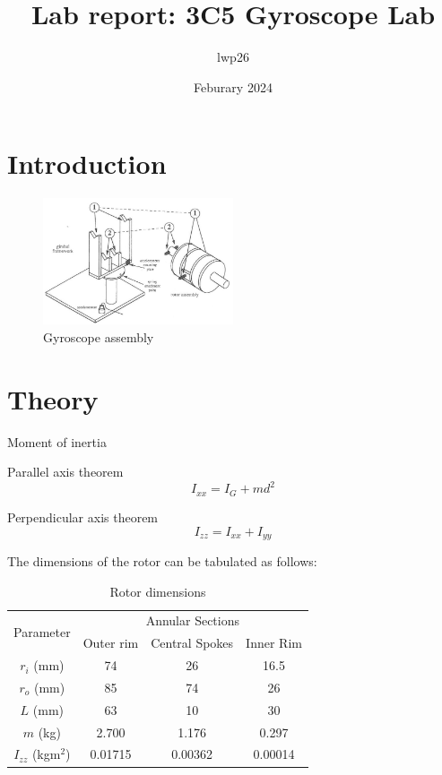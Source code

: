 \documentclass[8pt]{article}
\begin{document}

\title{Lab report: 3C5 Gyroscope Lab}
\author{lwp26}
\date{Feburary 2024}
\maketitle

\section{Introduction}


\begin{figure}[H]
    \centering
    \includegraphics[width=0.5\textwidth]{setup.jpg}
    \caption{Gyroscope assembly}
    \label{fig:setup}
\end{figure}

\section{Theory}

Moment of inertia 

Parallel axis theorem
\begin{equation}
    I_{xx} = I_G + md^2 
\end{equation}

Perpendicular axis theorem
\begin{equation}
    I_{zz} = I_{xx} + I_{yy}
\end{equation}

The dimensions of the rotor can be tabulated as follows:

\begin{table}[H]
    \centering
    \begin{tabular}{|c|c|c|c|}
        \hline
        \multirow{ 2}{*}{Parameter} & \multicolumn{3}{|c|}{Annular Sections} \\
        \cline{2-4}
        & Outer rim & Central Spokes & Inner Rim \\
        \hline
        $r_i$ (mm) & 74 & 26 & 16.5 \\
        $r_o$ (mm) & 85 & 74 & 26 \\
        $L$ (mm) & 63 & 10 & 30 \\
        \hline
        $m$ (kg) & 2.700 & 1.176 & 0.297 \\
        \hline
        $I_{zz}$ (kgm$^2$) & 0.01715	& 0.00362 & 0.00014 \\
        \hline

    \end{tabular}
    \caption{Rotor dimensions}
\end{table}
\end{document}
